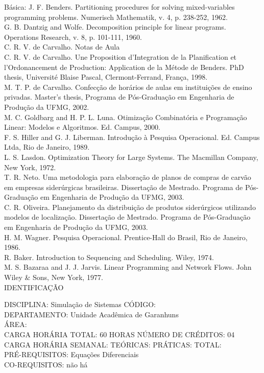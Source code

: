 \documentclass[
	12pt,				%
	openright,			%
  oneside,     %
	a4paper,			%
	chapter=TITLE,		%
	english,			%
	french,				%
	spanish,			%
	brazil				%
	]{abntex2}
\begin{document}
\begin{apendicesenv}
Básica:
J. F. Benders. Partitioning procedures for solving mixed-variables
programming problems. Numerisch Mathematik, v. 4, p. 238-252, 1962. \\
G. B. Dantzig and Wolfe. Decomposition principle for linear programs.
Operations Research, v. 8, p. 101-111, 1960. \\
C. R. V. de Carvalho. Notas de Aula\\
C. R. V. de Carvalho. Une Proposition d'Integration de
la Planification et l'Ordonancement de Production:
Application de la Métode de Benders. PhD thesis, Université Blaise
Pascal, Clermont-Ferrand, França, 1998. \\
M. T. P. de Carvalho. Confecção de horários de aulas em instituições de
ensino privadas. Master's thesis, Programa de
Pós-Graduação em Engenharia de Produção da UFMG, 2002. \\
M. C. Goldbarg and H. P. L. Luna. Otimização Combinatória e Programação
Linear: Modelos e Algoritmos. Ed. Campus, 2000. \\
F. S. Hiller and G. J. Liberman. Introdução à Pesquisa Operacional. Ed.
Campus Ltda, Rio de Janeiro, 1989. \\
L. S. Lasdon. Optimization Theory for Large Systems. The Macmillan
Company, New York, 1972. \\
T. R. Neto. Uma metodologia para elaboração de planos de compras de
carvão em empresas siderúrgicas brasileiras. Dissertação de Mestrado.
Programa de Pós-Graduação em Engenharia de Produção da UFMG, 2003. \\
C. R. Oliveira. Planejamento da distribuição de produtos siderúrgicos
utilizando modelos de localização. Dissertação de Mestrado. Programa de
Pós-Graduação em Engenharia de Produção da UFMG, 2003. \\
H. M. Wagner. Pesquisa Operacional. Prentice-Hall do Brasil, Rio de
Janeiro, 1986.\\
R. Baker. Introduction to Sequencing and Scheduling. Wiley, 1974.\\
M. S. Bazaraa and J. J. Jarvis. Linear Programming and Network Flows.
John Wiley \& Sons, New York, 1977. \\

\newpage IDENTIFICAÇÃO

DISCIPLINA: Simulação de Sistemas CÓDIGO:\\ 
DEPARTAMENTO: Unidade Acadêmica de Garanhuns\\ ÁREA: \\
CARGA HORÁRIA TOTAL: 60 HORAS NÚMERO DE CRÉDITOS: 04\\
CARGA HORÁRIA SEMANAL: TEÓRICAS: PRÁTICAS: TOTAL: \\
PRÉ-REQUISITOS: Equações Diferenciais\\
CO-REQUISITOS: não há


\end{apendicesenv}
\end{document}
